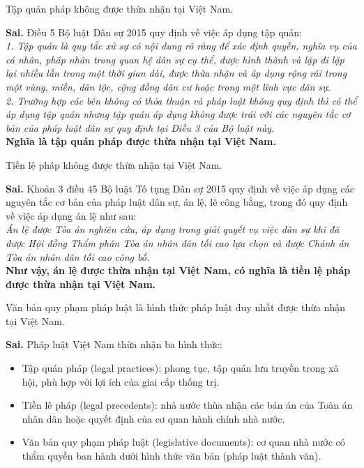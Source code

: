 \begin{ques}
Tập quán pháp không được thừa nhận tại Việt Nam.
\end{ques}
\begin{ans}
\textbf{Sai.} Điều 5 Bộ luật Dân sự 2015 quy định về việc áp dụng tập quán:\\
\textit{1. Tập quán là quy tắc xử sự có nội dung rõ ràng để xác định quyền, nghĩa vụ của cá nhân, pháp nhân trong quan hệ dân sự cụ thể, được hình thành và lặp đi lặp lại nhiều lần trong một thời gian dài, được thừa nhận và áp dụng rộng rãi trong một vùng, miền, dân tộc, cộng đồng dân cư hoặc trong một lĩnh vực dân sự.}\\
\textit{2. Trường hợp các bên không có thỏa thuận và pháp luật không quy định thì có thể áp dụng tập quán nhưng tập quán áp dụng không được trái với các nguyên tắc cơ bản của pháp luật dân sự quy định tại Điều 3 của Bộ luật này.}\\
\textbf{Nghĩa là tập quán pháp được thừa nhận tại Việt Nam.}
\end{ans}

\begin{ques}
Tiền lệ pháp không được thừa nhận tại Việt Nam.
\end{ques}
\begin{ans}
\textbf{Sai.} Khoản 3 điều 45 Bộ luật Tố tụng Dân sự 2015 quy định về việc áp dụng các nguyên tắc cơ bản của pháp luật dân sự, án lệ, lẽ công bằng, trong đó quy định về việc áp dụng án lệ như sau:\\
\textit{Án lệ được Tòa án nghiên cứu, áp dụng trong giải quyết vụ việc dân sự khi đã được Hội đồng Thẩm phán Tòa án nhân dân tối cao lựa chọn và được Chánh án Tòa án nhân dân tối cao công bố.}\\
\textbf{Như vậy, án lệ được thừa nhận tại Việt Nam, có nghĩa là tiền lệ pháp được thừa nhận tại Việt Nam.}
\end{ans}

\begin{ques}
Văn bản quy phạm pháp luật là hình thức pháp luật duy nhất được thừa nhận tại Việt Nam.
\end{ques}
\begin{ans}
\textbf{Sai.} Pháp luật Việt Nam thừa nhận ba hình thức:
\begin{itemize}
\item Tập quán pháp (legal practices): phong tục, tập quán lưu truyền trong xã hội, phù hợp với lợi ích của giai cấp thống trị.
\item Tiền lê pháp (legal precedents): nhà nước thùa nhận các bản án của Toàn án nhân dân hoặc quyết định của cơ quan hành chính nhà nước.
\item Văn bản quy phạm pháp luật (legislative documents): cơ quan nhà nước có thẩm quyền ban hành dưới hình thức văn bản (pháp luật thành văn).
\end{itemize}
\end{ans}

